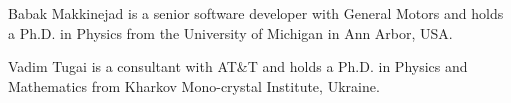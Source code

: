 \documentclass[journal]{IEEEtran}
\begin{document}

\begin{IEEEbiographynophoto}{Babak Makkinejad}
is a senior software developer with General Motors and holds a Ph.D. in Physics from the University of Michigan in Ann Arbor, USA.
\end{IEEEbiographynophoto}
\begin{IEEEbiographynophoto}{Vadim Tugai}
is a consultant with AT{\&}T and holds a Ph.D. in Physics and Mathematics from Kharkov Mono-crystal Institute, Ukraine.
\end{IEEEbiographynophoto}








\end{document}
